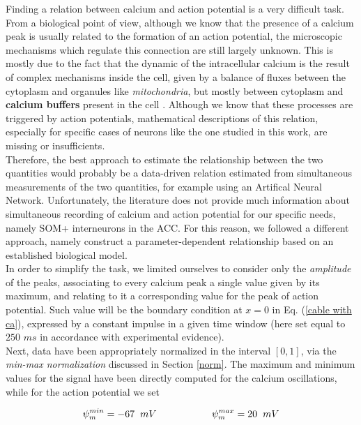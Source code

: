 \documentclass[12pt, a4paper]{report}
\begin{document}
Finding a relation between calcium and action potential is a very difficult task. From a biological point of view, although we know that the presence of a calcium peak is usually related to the formation of an action potential, the microscopic mechanisms which regulate this connection are still largely unknown. This is mostly due to the fact that the dynamic of the intracellular calcium is the result of complex mechanisms inside the cell, given by a balance of fluxes between the cytoplasm and organules like \textit{mitochondria}, but mostly between cytoplasm and \textbf{calcium buffers} present in the cell \cite{43}. Although we know that these processes are triggered by action potentials, mathematical descriptions of this relation, especially for specific cases of neurons like the one studied in this work, are missing or insufficients.\\
Therefore, the best approach to estimate the relationship between the two quantities would probably be a data-driven relation estimated from simultaneous measurements of the two quantities, for example using an Artifical Neural Network. Unfortunately, the literature does not provide much information about simultaneous recording of calcium and action potential for our specific needs, namely SOM+ interneurons in the ACC. For this reason, we followed a different approach, namely construct a parameter-dependent relationship based on an established biological model.\\
In order to simplify the task, we limited ourselves to consider only the \textit{amplitude} of the peaks, associating to every calcium peak a single value given by its maximum, and relating to it a corresponding value for the peak of action potential. Such value will be the boundary condition at $x=0$ in Eq. (\ref{cable with ca}), expressed by a constant impulse in a given time window (here set equal to $250$ $ms$ in accordance with experimental evidence).\\

Next, data have been appropriately normalized in the interval $[0,1]$, via the \textit{min-max normalization} discussed in Section \ref{norm}. The maximum and minimum values for the signal have been directly computed for the calcium oscillations, while for the action potential we set

\begin{equation}
\psi_m ^{min}= -67 \hspace{0.2cm} mV \hspace{2cm}	\psi_m ^{max} = 20 \hspace{0.2cm} mV
\end{equation}
 
\end{document}
